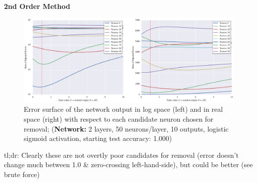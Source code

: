 \textbf{2nd Order Method}
\begin{figure}
\centering
\includegraphics[width=\linewidth]{png/mnist-deep-g1-gain.pdf}
\caption{Error surface of the network output in log space (left) and in real space (right) with respect to each candidate neuron chosen for removal; (\textbf{Network:} 2 layers, 50 neurons/layer, 10 outputs, logistic sigmoid activation, starting test accuracy: 1.000)}
\label{fig:mnist-g2-double-layer}
\end{figure}
tl;dr: Clearly these are not overtly poor candidates for removal (error doesn't change much between 1.0 \& zero-crossing left-hand-side), but could be better (see brute force)
